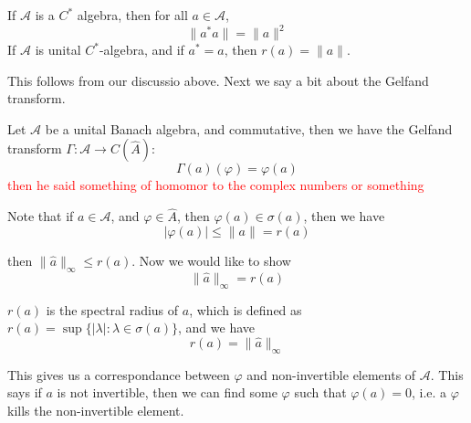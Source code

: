\begin{corollary}
    If $\mathcal{A}$ is a $C^*$ algebra, then for all $a\in\mathcal{A}$,
    \begin{equation*}
        \|a^*a\|=\|a\|^2
    \end{equation*}
    If $\mathcal{A}$ is unital $C^*$-algebra, and if $a^*=a$, then $r(a)=\|a\|$.
\end{corollary}
This follows from our discussio above. Next we say a bit about the Gelfand transform.
\begin{definition}
    Let $\mathcal{A}$ be a unital Banach algebra, and commutative, then we have the Gelfand transform $\Gamma:\mathcal{A}\to C(\widehat{A})$:
    \begin{equation*}
        \Gamma(a)(\varphi)=\varphi(a)
    \end{equation*}
    \textcolor{red}{then he said something of homomor to the complex numbers or something}
\end{definition}

Note that if $a\in\mathcal{A}$, and $\varphi\in\widehat{A}$, then $\varphi(a)\in\sigma(a)$, then we have
\begin{equation*}
    |\varphi(a)|\leq\|a\|=r(a)
\end{equation*}

then $\|\widehat{a}\|_\infty\leq r(a)$. Now we would like to show
\begin{equation*}
    \|\widehat{a}\|_\infty=r(a)
\end{equation*}
\begin{theorem}
    $r(a)$ is the spectral radius of $a$, which is defined as $r(a)=\sup\{|\lambda|:\lambda\in\sigma(a)\}$, and we have
    \begin{equation*}
        r(a)=\|\widehat{a}\|_\infty
    \end{equation*}
\end{theorem}\begin{note}
    This gives us a correspondance between $\varphi$ and non-invertible elements of $\mathcal{A}$. This says if $a$ is not invertible, then we can find some $\varphi$ such that $\varphi(a)=0$, i.e. a $\varphi$ kills the non-invertible element.
\end{note}

